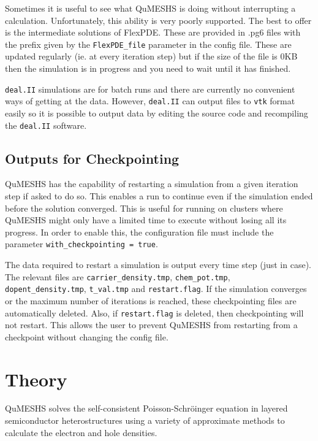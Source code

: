 \documentclass[12pt]{article}
\begin{document}
Sometimes it is useful to see what QuMESHS is doing without interrupting a calculation.
Unfortunately, this ability is very poorly supported.  The best to offer is the intermediate
solutions of FlexPDE.  These are provided in .pg6 files with the prefix given by the
\texttt{FlexPDE\_file} parameter in the config file.  These are updated regularly (ie.
at every iteration step) but if the size of the file is 0KB then the simulation is in
progress and you need to wait until it has finished.

\texttt{deal.II} simulations are for batch runs and there are currently no convenient ways
of getting at the data.  However, \texttt{deal.II} can output files to \texttt{vtk} format
easily so it is possible to output data by editing the source code and recompiling the
\texttt{deal.II} software.


\subsection{Outputs for Checkpointing}
\label{subsec:CheckpointOutput}

QuMESHS has the capability of restarting a simulation from a given iteration step if asked
to do so.  This enables a run to continue even if the simulation ended before the solution
converged.  This is useful for running on clusters where QuMESHS might only have a limited
time to execute without losing all its progress.  In order to enable this, the configuration
file must include the parameter \texttt{with\_checkpointing = true}.

The data required to restart a simulation is output every time step (just in case).  The
relevant files are \texttt{carrier\_density.tmp}, \texttt{chem\_pot.tmp}, \texttt{dopent\_density.tmp},
\texttt{t\_val.tmp} and \texttt{restart.flag}.  If the simulation converges or the maximum
number of iterations is reached, these checkpointing files are automatically deleted.  Also,
if \texttt{restart.flag} is deleted, then checkpointing will not restart.  This allows the
user to prevent QuMESHS from restarting from a checkpoint without changing the config file.


\section{Theory}

QuMESHS solves the self-consistent Poisson-Schr\"{o}inger equation in layered semiconductor
heterostructures using a variety of approximate methods to calculate the electron and
hole densities.
\end{document}
